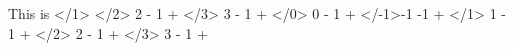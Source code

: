 \par\noindent This is \CurrentFile
\mySection</1>{         \myRLTVBaseExpected}
\mySection</2>{ 2 - 1 + \myRLTVBaseExpected}
\mySection</3>{ 3 - 1 + \myRLTVBaseExpected}
\mySection</0>{ 0 - 1 + \myRLTVBaseExpected}
\mySection</-1>{-1 -1 + \myRLTVBaseExpected}
\mySection</1>{ 1 - 1 + \RLTVBase}
\mySection</2>{ 2 - 1 + \RLTVBase}
\mySection</3>{ 3 - 1 + \RLTVBase}
